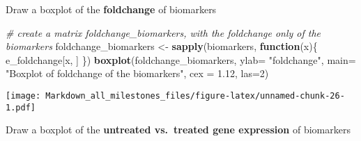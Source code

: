 \documentclass[]{article}
\newenvironment{Shaded}{\begin{snugshade}}{\end{snugshade}}
\newcommand{\CommentTok}[1]{\textcolor[rgb]{0.56,0.35,0.01}{\textit{#1}}}
\newcommand{\ControlFlowTok}[1]{\textcolor[rgb]{0.13,0.29,0.53}{\textbf{#1}}}
\newcommand{\DataTypeTok}[1]{\textcolor[rgb]{0.13,0.29,0.53}{#1}}
\newcommand{\DecValTok}[1]{\textcolor[rgb]{0.00,0.00,0.81}{#1}}
\newcommand{\FloatTok}[1]{\textcolor[rgb]{0.00,0.00,0.81}{#1}}
\newcommand{\KeywordTok}[1]{\textcolor[rgb]{0.13,0.29,0.53}{\textbf{#1}}}
\newcommand{\NormalTok}[1]{#1}
\newcommand{\StringTok}[1]{\textcolor[rgb]{0.31,0.60,0.02}{#1}}
\begin{document}
Draw a boxplot of the \textbf{foldchange} of biomarkers

\begin{Shaded}
\begin{Highlighting}[]
\CommentTok{# create a matrix foldchange_biomarkers, with the foldchange only of the biomarkers}
\NormalTok{foldchange_biomarkers <-}\StringTok{ }\KeywordTok{sapply}\NormalTok{(biomarkers, }\ControlFlowTok{function}\NormalTok{(x)\{}
\NormalTok{  e_foldchange[x, ]}
\NormalTok{\})}
\KeywordTok{boxplot}\NormalTok{(foldchange_biomarkers, }\DataTypeTok{ylab=} \StringTok{"foldchange"}\NormalTok{, }
        \DataTypeTok{main=} \StringTok{"Boxplot of foldchange of the biomarkers"}\NormalTok{, }\DataTypeTok{cex =} \FloatTok{1.12}\NormalTok{, }\DataTypeTok{las=}\DecValTok{2}\NormalTok{)}
\end{Highlighting}
\end{Shaded}

\texttt{[image: Markdown\_all\_milestones\_files/figure-latex/unnamed-chunk-26-1.pdf]}

Draw a boxplot of the \textbf{untreated vs.~treated gene expression} of
biomarkers
\end{document}
